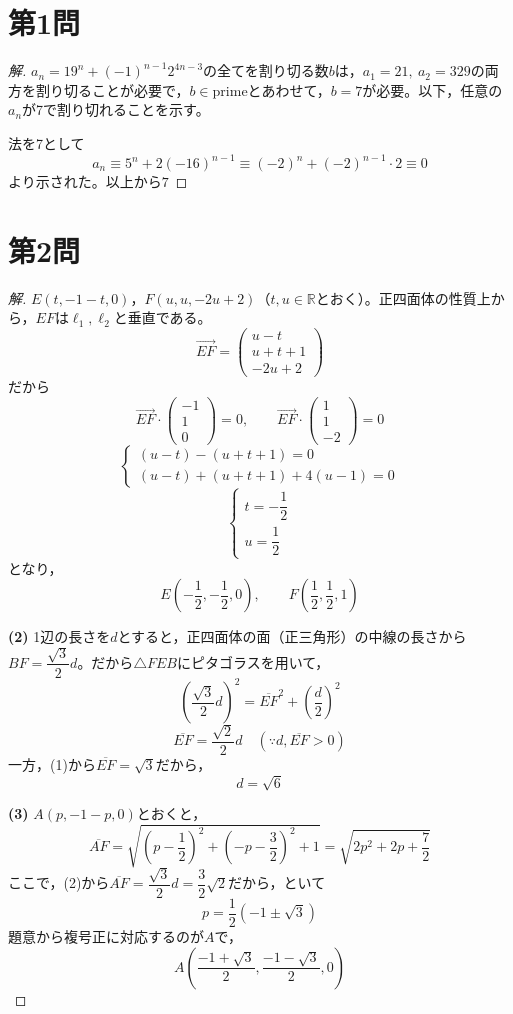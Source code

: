 \documentclass[../main.tex]{subfiles}
\begin{document}
\section*{第1問}

\begin{proof}[解]
  $a_n=19^n+(-1)^{n-1}2^{4n-3}$の全てを割り切る数$b$は，$a_1=21,\ a_2=329$の両方を割り切ることが必要で，$b\in\text{prime}$とあわせて，$b=7$が必要。以下，任意の$a_n$が7で割り切れることを示す。

  法を7として
  \[
    a_n\equiv5^n+2(-16)^{n-1}\equiv(-2)^n+(-2)^{n-1}\cdot2\equiv0
  \]
  より示された。以上から$7$
\end{proof}

\newpage

\section*{第2問}

\begin{proof}[解]
  $E(t,-1-t,0)$，$F(u,u,-2u+2)$（$t,u\in\mathbb{R}$とおく）。正四面体の性質上から，$EF$は$\ell_1,\ell_2$と垂直である。
  \[
    \overrightarrow{EF}=
    \begin{pmatrix}u-t\\u+t+1\\-2u+2
    \end{pmatrix}
  \]
  だから
  \[
    \overrightarrow{EF}\cdot
    \begin{pmatrix}-1\\1\\0
    \end{pmatrix}=0, \qquad
    \overrightarrow{EF}\cdot
    \begin{pmatrix}1\\1\\-2
    \end{pmatrix}=0
  \]
  \[
    \begin{cases}
      (u-t)-(u+t+1)=0 \\
      (u-t)+(u+t+1)+4(u-1)=0
    \end{cases}
  \]
  \[
    \begin{cases}
      t=-\dfrac12 \\
      u=\dfrac12
    \end{cases}
  \]
  となり，
  \[
    E\left(-\frac12,-\frac12,0\right), \qquad F\left(\frac12,\frac12,1\right)
  \]

  \textbf{(2)} 1辺の長さを$d$とすると，正四面体の面（正三角形）の中線の長さから$BF=\dfrac{\sqrt3}{2}d$。だから$\triangle FEB$にピタゴラスを用いて，
  \[
    \left(\frac{\sqrt3}{2}d\right)^2=\overline{EF}^2+\left(\frac{d}{2}\right)^2
  \]
  \[
    \overline{EF}=\frac{\sqrt2}{2}d \quad(\because d,\overline{EF}>0)
  \]
  一方，(1)から$\overline{EF}=\sqrt3$だから，
  \[
    d=\sqrt6
  \]

  \textbf{(3)} $A(p,-1-p,0)$とおくと，
  \[
    \overline{AF}=\sqrt{\left(p-\frac12\right)^2+\left(-p-\frac32\right)^2+1}=\sqrt{2p^2+2p+\frac72}
  \]
  ここで，(2)から$\overline{AF}=\dfrac{\sqrt3}{2}d=\dfrac32\sqrt2$だから，といて
  \[
    p=\frac12(-1\pm\sqrt3)
  \]
  題意から複号正に対応するのが$A$で，
  \[
    A\left(\frac{-1+\sqrt3}{2},\frac{-1-\sqrt3}{2},0\right)
  \]
\end{proof}
\end{document}
